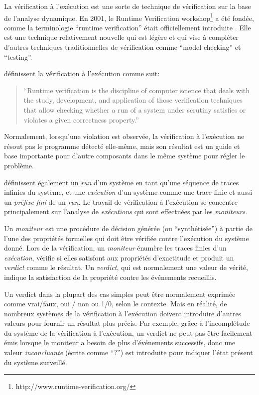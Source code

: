 La vérification à l'exécution est une sorte de technique de vérification sur la base de l'analyse dynamique. En 2001, le Runtime Verification workshop\footnote{http://www.runtime-verification.org/} a été fondée, comme la terminologie ``runtime verification'' était officiellement introduite \citep{wiki:rv}. Elle est une technique relativement nouvelle qui est légère et qui vise à compléter d'autres techniques traditionnelles de vérification comme ``model checking'' et ``testing''.

\cite{leucker2009brief} définissent la vérification à l'exécution comme suit:

\begin{quote}
``Runtime verification is the discipline of computer science that deals with the study, development, and application of those verification techniques that allow checking whether a run of a system under scrutiny satisfies or violates a given correctness property.''
\end{quote}

Normalement, lorsqu'une violation est observée, la vérification à l'exécution ne résout pas le programme détecté elle-même, mais son résultat est un guide et base importante pour d'autre composants dans le même système pour régler le problème.

\cite{leucker2009brief} définissent également un \emph{run} d'un système en tant qu'une séquence de traces infinies du système, et une \emph{exécution} d'un système comme une trace finie et aussi un \emph{préfixe fini} de un \emph{run}. Le travail de vérification à l'exécution se concentre principalement sur l'analyse de \emph{exécutions} qui sont effectuées par les \emph{moniteurs}.

Un \emph{moniteur} est une procédure de décision générée (ou ``synthétisée'') à partie de l'une des propriétés formelles qui doit être vérifiée contre l'exécution du système donné. Lors de la vérification, un \emph{moniteur} énumère les traces finies d'un \emph{exécution}, vérifie si elles satisfont aux propriétés d'exactitude et produit un \emph{verdict} comme le résultat. Un \emph{verdict}, qui est normalement une valeur de vérité, indique la satisfaction de la propriété contre les événements recueillis.

Un verdict dans la plupart des cas simples peut être normalement exprimée comme vrai/faux, oui / non ou 1/0, selon le contexte. Mais en réalité, de nombreux systèmes de la vérification à l'exécution doivent introduire d'autres valeurs pour fournir un résultat plus précis. Par exemple, grâce à l'incomplétude du système de la vérification à l'exécution, un verdict ne peut pas être facilement émis lorsque le moniteur a besoin de plus d'événements successifs, donc une valeur \emph{inconcluante} (écrite comme ``?'') est introduite pour indiquer l'état présent du système surveillé. \citep{falcone2013tutorial}

